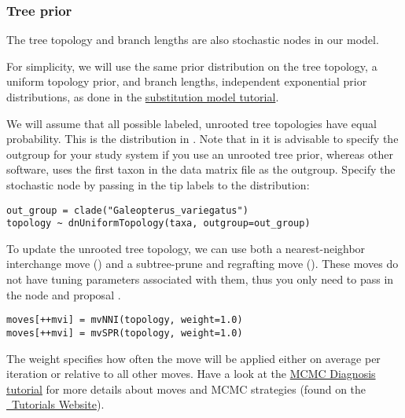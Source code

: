 \subsubsection{Tree prior}

The tree topology and branch lengths are also stochastic nodes in our model. 

For simplicity, we will use the same prior distribution on the tree topology, a uniform topology prior, and branch lengths, independent exponential prior distributions, as done in the \href{https://github.com/revbayes/revbayes_tutorial/raw/master/tutorial_TeX/RB_CTMC_Tutorial/RB_CTMC_Tutorial.pdf}{substitution model tutorial}.

We will assume that all possible labeled, unrooted tree topologies have equal probability. 
This is the  distribution in \RevBayes. 
Note that in \RevBayes it is advisable to specify the outgroup for your study system if you use an unrooted tree prior, whereas other software, \EG \MrBayes uses the first taxon in the data matrix file as the outgroup.
Specify the  stochastic node by passing in the tip labels  to the  distribution:
{\tt \begin{snugshade*}
\begin{lstlisting}
out_group = clade("Galeopterus_variegatus")
topology ~ dnUniformTopology(taxa, outgroup=out_group)
\end{lstlisting}
\end{snugshade*}}

To update the unrooted tree topology, we can use both a nearest-neighbor interchange move () and a subtree-prune and regrafting move (). 
These moves do not have tuning parameters associated with them, thus you only need to pass in the  node and proposal . 
{\tt \begin{snugshade*}
\begin{lstlisting}
moves[++mvi] = mvNNI(topology, weight=1.0)
moves[++mvi] = mvSPR(topology, weight=1.0)
\end{lstlisting}
\end{snugshade*}}
The weight specifies how often the move will be applied either on average per iteration or relative to all other moves.
Have a look at the \href{https://github.com/revbayes/revbayes_tutorial/raw/master/tutorial_TeX/RB_MCMC_Tutorial/RB_MCMC_Tutorial.pdf}{MCMC Diagnosis tutorial} for more details about moves and MCMC strategies (found on the \href{http://revbayes.github.io/tutorials.html}{\RevBayes~Tutorials Website}).


